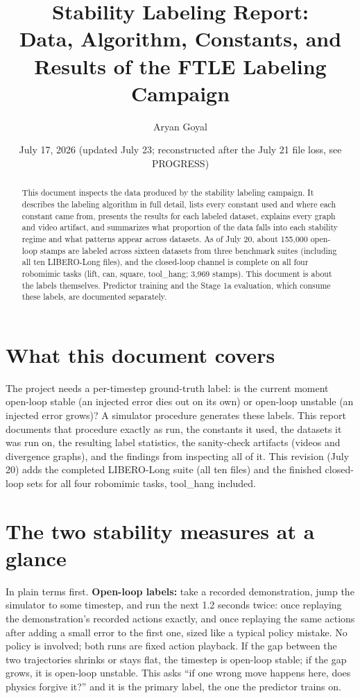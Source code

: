 \documentclass[11pt]{article}
\title{Stability Labeling Report:\\ \large Data, Algorithm, Constants, and Results of the FTLE Labeling Campaign}
\author{Aryan Goyal}
\date{July 17, 2026 (updated July 23; reconstructed after the July 21 file loss, see PROGRESS)}
\begin{document}
\maketitle

\begin{abstract}
\noindent
This document inspects the data produced by the stability labeling campaign. It
describes the labeling algorithm in full detail, lists every constant used and where
each constant came from, presents the results for each labeled dataset, explains every
graph and video artifact, and summarizes what proportion of the data falls into each
stability regime and what patterns appear across datasets. As of July 20, about
155{,}000 open-loop stamps are labeled across sixteen datasets from three benchmark
suites (including all ten LIBERO-Long files), and the closed-loop channel is complete
on all four robomimic tasks (lift, can, square, tool\_hang; 3{,}969 stamps). This document is about the labels themselves. Predictor
training and the Stage 1a evaluation, which consume these labels, are documented
separately.
\end{abstract}

\tableofcontents
\newpage

\section{What this document covers}

The project needs a per-timestep ground-truth label: is the current moment open-loop
stable (an injected error dies out on its own) or open-loop unstable (an injected
error grows)? A simulator procedure generates these labels. This report documents that
procedure exactly as run, the constants it used, the datasets it was run on, the
resulting label statistics, the sanity-check artifacts (videos and divergence graphs),
and the findings from inspecting all of it. This revision (July 20) adds the
completed LIBERO-Long suite (all ten files) and the finished closed-loop sets for
all four robomimic tasks, tool\_hang included.

\section{The two stability measures at a glance}
\label{sec:glance}

In plain terms first. \textbf{Open-loop labels:} take a recorded
demonstration, jump the simulator to some timestep, and run the next 1.2
seconds twice: once replaying the demonstration's recorded actions exactly,
and once replaying the same actions after adding a small error to the first
one, sized like a typical policy mistake. No policy is involved; both runs
are fixed action playback. If the gap between the two trajectories shrinks
or stays flat, the timestep is open-loop stable; if the gap grows, it is
open-loop unstable. This asks ``if one wrong move happens here, does physics
forgive it?'' and it is the primary label, the one the predictor trains on.
\end{document}

